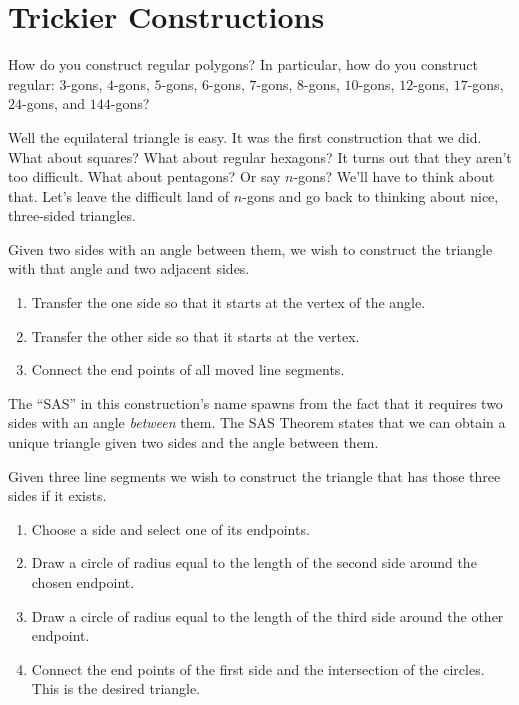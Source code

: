 \newpage

\section{Trickier Constructions}

\begin{question} 
How do you construct regular polygons? In particular, how do you
construct regular: $3$-gons, $4$-gons, $5$-gons, $6$-gons, $7$-gons,
$8$-gons, $10$-gons, $12$-gons, $17$-gons, $24$-gons, and $144$-gons?
\end{question}
\QM

Well the equilateral triangle is easy. It was the first construction
that we did. What about squares? What about regular hexagons? It turns
out that they aren't too difficult. What about pentagons? Or say
$n$-gons? We'll have to think about that. Let's leave the difficult
land of $n$-gons and go back to thinking about nice, three-sided
triangles.

\begin{construction}  
Given two sides with an angle between them, we wish to construct the
triangle with that angle and two adjacent sides.
\begin{enumerate}
\item Transfer the one side so that it starts at the vertex of the
  angle.
\item Transfer the other side so that it starts at the vertex. 
\item Connect the end points of all moved line segments.
\end{enumerate}
\end{construction}

The ``SAS'' in this construction's name spawns from the fact that it
requires two sides with an angle \textit{between} them. The SAS
Theorem states that we can obtain a unique triangle given two sides
and the angle between them.


\begin{construction} 
Given three line segments we wish to construct the triangle that has
those three sides if it exists.
\begin{enumerate}
\item Choose a side and select one of its endpoints.
\item Draw a circle of radius equal to the length of the second side
  around the chosen endpoint.
\item Draw a circle of radius equal to the length of the third side
  around the other endpoint.
\item Connect the end points of the first side and the intersection of
  the circles. This is the desired triangle.
\end{enumerate}
\end{construction}


